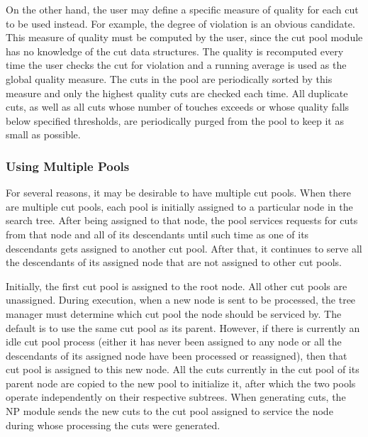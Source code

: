 On the other hand, the user may define a specific measure of quality for
each cut to be used instead. For example, the degree of
violation is an obvious candidate. This measure of quality must be
computed by the user, since the cut pool module has no knowledge of
the cut data structures. The quality is recomputed every time
the user checks the cut for violation and a running average is used as
the global quality measure. The cuts in the pool are periodically
sorted by this measure and only the highest quality cuts
are checked each time. All duplicate cuts, as well as all cuts whose
number of touches exceeds or whose quality falls below specified
thresholds, are periodically purged from the pool to keep it as small as
possible.

\subsubsection{Using Multiple Pools}
\label{multi-cut-pools}

For several reasons, it may be desirable to have multiple cut pools.
When there are multiple cut pools, each pool is initially assigned
to a particular node in the search tree. After being assigned to that
node, the pool services requests for cuts from that node and all
of its descendants until such time as one of its descendants gets
assigned to another cut pool. After that, it continues to
serve all the descendants of its assigned node that are not assigned
to other cut pools.

Initially, the first cut pool is assigned to the root node. All other cut
pools are unassigned. During execution, when a new node is sent to be
processed, the tree manager must determine which cut pool the node should be
serviced by. The default is to use the same cut pool as its parent. However,
if there is currently an idle cut pool process (either it has never been
assigned to any node or all the descendants of its assigned node have been
processed or reassigned), then that cut pool is assigned to this new node. All
the cuts currently in the cut pool of its parent node are copied to the new
pool to initialize it, after which the two pools operate independently on
their respective subtrees. When generating cuts, the NP module sends the new
cuts to the cut pool assigned to service the node during whose processing the
cuts were generated.

